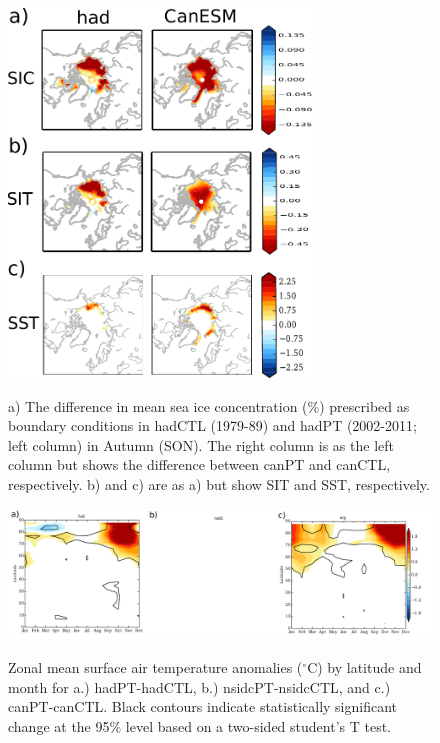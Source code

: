 \documentclass[twocol]{ametsoc}
\begin{document}
\begin{figure}[t]
  \noindent\includegraphics[width=19pc,angle=0]{oneseasBCsnonsidc.pdf}\\
  \caption{a) The difference in mean sea ice concentration (\%) prescribed as boundary conditions in hadCTL (1979-89) and hadPT (2002-2011; left column) in Autumn (SON). The right column is as the left column but shows the difference between canPT and canCTL, respectively. b) and c) are as a) but show SIT and SST, respectively.
}\label{f1}
\end{figure}

\begin{figure}[t]
  \noindent\includegraphics[width=39pc,angle=0]{SATwithlat.pdf}\\
  \caption{Zonal mean surface air temperature anomalies ($^\circ$C) by latitude and month for a.) hadPT-hadCTL, b.) nsidcPT-nsidcCTL, and c.) canPT-canCTL. Black contours indicate statistically significant change at the 95\% level based on a two-sided student's T test.
}\label{f1b}
\end{figure}
\end{document}

